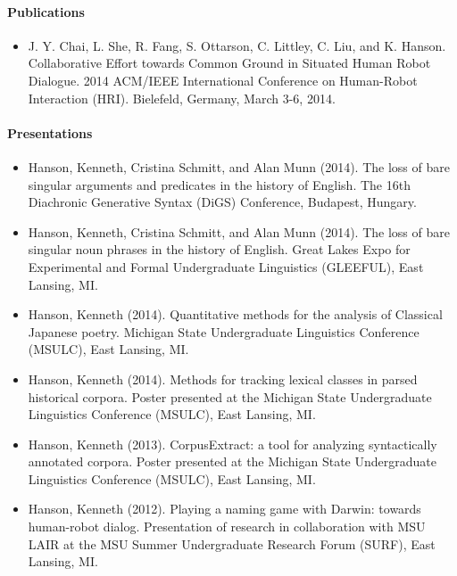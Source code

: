 \documentclass[10pt,oneside]{article}
\newenvironment{ressection}[1]{
	\paragraph{\Large#1}
	\begin{itemize}
}{
	\end{itemize}
}
\begin{document}
\begin{ressection}{Publications}
	\item{J. Y. Chai, L. She, R. Fang, S. Ottarson, C. Littley, C. Liu, and K. Hanson. Collaborative Effort towards Common Ground in Situated Human Robot Dialogue. 2014 ACM/IEEE International Conference on Human-Robot Interaction (HRI). Bielefeld, Germany, March 3-6, 2014.}
\end{ressection}


\begin{ressection}{Presentations}
	\item{Hanson, Kenneth, Cristina Schmitt, and Alan Munn (2014). The loss of bare singular arguments and predicates in the history of English. The 16th Diachronic Generative Syntax (DiGS) Conference, Budapest, Hungary.}
	
	\item{Hanson, Kenneth, Cristina Schmitt, and Alan Munn (2014). The loss of bare singular noun phrases in the history of English. Great Lakes Expo for Experimental and Formal Undergraduate Linguistics (GLEEFUL), East Lansing, MI.}
	
	\item{Hanson, Kenneth (2014). Quantitative methods for the analysis of Classical Japanese poetry. Michigan State Undergraduate Linguistics Conference (MSULC), East Lansing, MI.}
	
	\item{Hanson, Kenneth (2014). Methods for tracking lexical classes in parsed historical corpora. Poster presented at the Michigan State Undergraduate Linguistics Conference (MSULC), East Lansing, MI.}
	
    \item{Hanson, Kenneth (2013). CorpusExtract: a tool for analyzing syntactically annotated corpora. Poster presented at the Michigan State Undergraduate Linguistics Conference (MSULC), East Lansing, MI.}
    
    \item{Hanson, Kenneth (2012). Playing a naming game with Darwin: towards human-robot dialog. Presentation of research in collaboration with MSU LAIR at the MSU Summer Undergraduate Research Forum (SURF), East Lansing, MI.}
\end{ressection}
\end{document}
